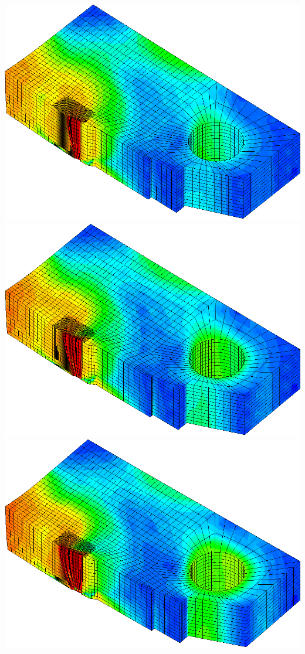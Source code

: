 \begin{frame}{}
{\begin{itemize}
{{\begin{textblock*}{12cm}
        \includegraphics[height=0.25\textheight]{images/rousselier_05}\\
        \includegraphics[height=0.25\textheight]{images/rousselier_06}
        \includegraphics[height=0.25\textheight]{images/rousselier_07}

\end{textblock*}}}
\end{itemize}}
\end{frame}

